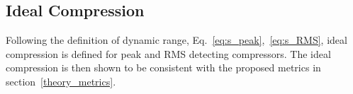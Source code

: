 \documentclass[../main2.tex]{subfiles}
\providecommand{\rootdir}{..}
\begin{document}
\FloatBarrier
\subsection{Ideal Compression}
Following the definition of dynamic range, Eq.~\eqref{eq:s_peak},~\eqref{eq:s_RMS}, ideal compression is defined for peak and RMS detecting compressors. The ideal compression is then shown to be consistent with the proposed metrics in section~\ref{theory_metrics}.

%

\end{document}
